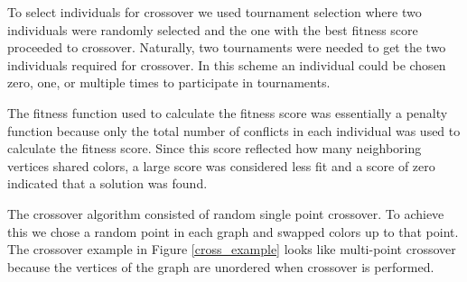 \documentclass{article}
\begin{document}
	
	
	To select individuals for crossover we used tournament selection where two individuals were randomly selected and the one with the best fitness score  proceeded to crossover. Naturally, two tournaments were needed to get the two individuals required for crossover. In this scheme an individual could be chosen zero, one, or multiple times to participate in tournaments.
	
	The fitness function used to calculate the fitness score was essentially a penalty function because only the total number of conflicts in each individual was used to calculate the fitness score. Since this score reflected how many neighboring vertices shared colors, a large score was considered less fit and a score of zero indicated that a solution was found. 
	
	The crossover algorithm consisted of random single point crossover. To achieve this we chose a random point in each graph and swapped colors up to that point. The crossover example in Figure \ref{cross_example} looks like multi-point crossover because the vertices of the graph are unordered when crossover is performed.
	
	
	
	
	
\end{document}
